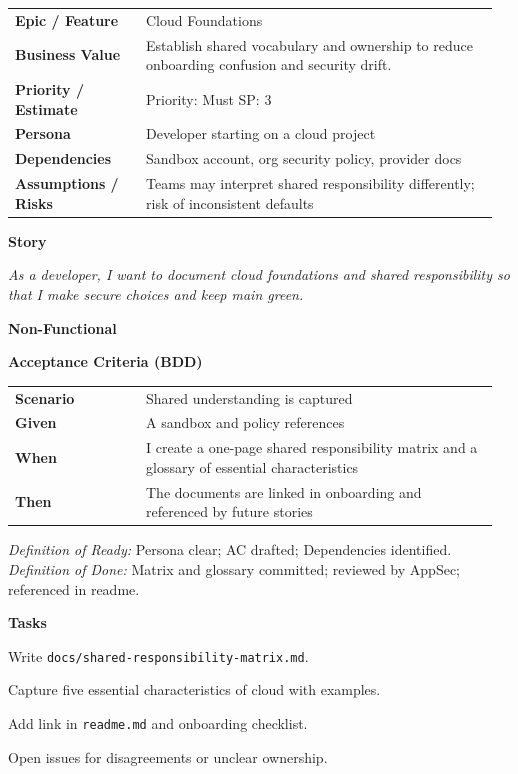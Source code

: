 \documentclass[11pt,letterpaper]{article}
\makeatletter
\newenvironment{kvtable}{%
  \par\noindent\begin{tabular}{@{}>{\raggedright\bfseries\arraybackslash}p{0.26\linewidth} >{\raggedright\arraybackslash}p{0.70\linewidth}@{}}
}{\end{tabular}\par}
\newenvironment{bdd}{%
  \par\noindent\begin{tabular}{@{}>{\raggedright\bfseries\arraybackslash}p{0.26\linewidth} >{\raggedright\arraybackslash}p{0.70\linewidth}@{}}
}{\end{tabular}\par}
\newcommand{\DoRDoD}[2]{%
  \vspace{0.35em}
  {\footnotesize\color{Muted}%
    \textit{Definition of Ready:} #1 \; \textbullet\;
    \textit{Definition of Done:} #2%
  }%
}
\newenvironment{storycard}[2]{%
  \begin{tcolorbox}[cloudcard, title={#1 --- #2}]%
}{\end{tcolorbox}}
\newcommand{\sectionlabel}[1]{\par\vspace{0.35em}\textbf{#1}\par}
\makeatother
\begin{document}
\begin{storycard}{CCS-1}{Ch. 1 — Foundations \& Essentials}
\begin{kvtable}
Epic / Feature & Cloud Foundations\\
Business Value & Establish shared vocabulary and ownership to reduce onboarding confusion and security drift.\\
Priority / Estimate & Priority: Must \quad SP: 3\\
Persona & Developer starting on a cloud project\\
Dependencies & Sandbox account, org security policy, provider docs\\
Assumptions / Risks & Teams may interpret shared responsibility differently; risk of inconsistent defaults\\
\end{kvtable}
\sectionlabel{Story}
\textit{As a developer, I want to document cloud foundations and shared responsibility so that I make secure choices and keep main green.}
\sectionlabel{Non-Functional}\;\;
\sectionlabel{Acceptance Criteria (BDD)}
\begin{bdd}
Scenario & Shared understanding is captured\\
Given & A sandbox and policy references\\
When & I create a one-page shared responsibility matrix and a glossary of essential characteristics\\
Then & The documents are linked in onboarding and referenced by future stories\\
\end{bdd}
\DoRDoD{Persona clear; AC drafted; Dependencies identified.}{Matrix and glossary committed; reviewed by AppSec; referenced in readme.}
\sectionlabel{Tasks}
\begin{checklist}
\item Write \texttt{docs/shared-responsibility-matrix.md}.
\item Capture five essential characteristics of cloud with examples.
\item Add link in \texttt{readme.md} and onboarding checklist.
\item Open issues for disagreements or unclear ownership.
\end{checklist}
\end{storycard}
\end{document}
